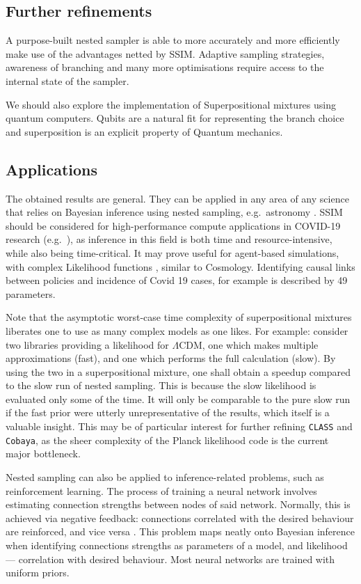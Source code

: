 \documentclass[usenatbib]{mnras}
\begin{document}
\subsection{Further refinements}\label{sec:org8314ddf}

A purpose-built nested sampler is able to more accurately and more
efficiently make use of the advantages netted by SSIM. Adaptive
sampling strategies, awareness of branching and many more
optimisations require access to the internal state of the sampler. 

We should also explore the implementation of Superpositional mixtures
using quantum computers. Qubits are a natural fit for representing the
branch choice and superposition is an explicit property of Quantum
mechanics.

\subsection{Applications}\label{sec:applications}
The obtained results are general. They can be applied in any area of
any science that relies on Bayesian inference using nested sampling,
e.g.~astronomy \citep{Casado_2016}. SSIM should be considered for
high-performance compute applications in COVID-19 research
(e.g.~\cite{Covid1,Covid2}), as inference in this field is both time
and resource-intensive, while also being time-critical. It may prove
useful for agent-based simulations, with complex Likelihood functions
\citep{Covid2}, similar to Cosmology. Identifying causal links between
policies and incidence of Covid 19 cases, for example is described by
49 parameters.

Note that the asymptotic worst-case time complexity of superpositional
mixtures liberates one to use as many complex models as one likes. For
example: consider two libraries providing a likelihood for
\(\Lambda\)CDM, one which makes multiple approximations (fast), and
one which performs the full calculation (slow). By using the two in a
superpositional mixture, one shall obtain a speedup compared to the
slow run of nested sampling. This is because the slow likelihood is
evaluated only some of the time. It will only be comparable to the
pure slow run if the fast prior were utterly unrepresentative of the
results, which itself is a valuable insight. This may be of particular
interest for further refining \texttt{CLASS} and \texttt{Cobaya}, as
the sheer complexity of the Planck likelihood code is the current
major bottleneck.

Nested sampling can also be applied to inference-related problems,
such as reinforcement learning. The process of training a neural
network involves estimating connection strengths between nodes of said
network. Normally, this is achieved via negative feedback: connections
correlated with the desired behaviour are reinforced, and vice versa
\cite{Kaelbling_1996}. This problem maps neatly onto Bayesian
inference when identifying connections strengths as parameters of a
model, and likelihood --- correlation with desired behaviour. Most
neural networks are trained with uniform priors.
\end{document}
